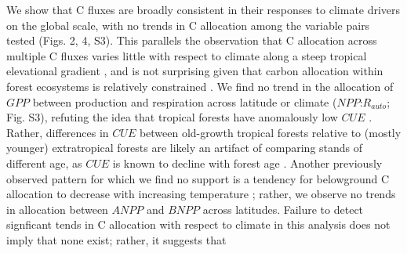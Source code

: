 \documentclass[
]{article}
\begin{document}
We show that C fluxes are broadly consistent in their responses to
climate drivers on the global scale, with no trends in C allocation
among the variable pairs tested (Figs. 2, 4, S3). This parallels the
observation that C allocation across multiple C fluxes varies little
with respect to climate along a steep tropical elevational gradient
\citetext{\citealp{malhi_variation_2017}; \citealp[but
see][]{moser_elevation_2011}}, and is not surprising given that carbon
allocation within forest ecosystems is relatively constrained
\citep{enquist_global_2002, litton_carbon_2007, malhi_allocation_2011}.
We find no trend in the allocation of \(GPP\) between production and
respiration across latitude or climate (\(NPP\):\(R_{auto}\); Fig. S3),
refuting the idea that tropical forests have anomalously low \(CUE\)
\citep{de_lucia_forest_2007, malhi_productivity_2012, anderson-teixeira_carbon_2016}.
Rather, differences in \(CUE\) between old-growth tropical forests
relative to (mostly younger) extratropical forests are likely an
artifact of comparing stands of different age, as \(CUE\) is known to
decline with forest age
\citep{de_lucia_forest_2007, piao_forest_2010, collalti_is_2019}.
Another previously observed pattern for which we find no support is a
tendency for belowground C allocation to decrease with increasing
temperature \citep{moser_elevation_2011, gill_belowground_2016}; rather,
we observe no trends in allocation between \(ANPP\) and \(BNPP\) across
latitudes. Failure to detect signficant tends in C allocation with
respect to climate in this analysis does not imply that none exist;
rather, it suggests that
\end{document}
